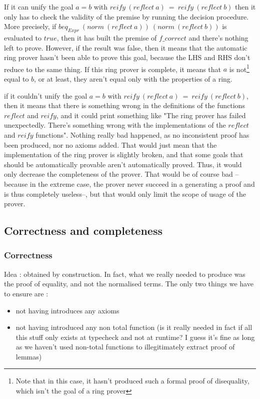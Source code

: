 \itemize
\item
If it can unify the goal $a=b$ with $reify\ (reflect\ a)\ =\ reify\ (reflect\ b)$ then it only has to check the validity of the premise by running the decision procedure. More precisely, if $beq_{Expr}\ (norm\ (reflect\ a))\ (norm\ (reflect\ b))$ is evaluated to $true$, then it has built the premise of $f\_correct$ and there's nothing left to prove. However, if the result was false, then it means that the automatic ring prover hasn't been able to prove this goal, because the LHS and RHS don't reduce to the same thing. If this ring prover is complete, it means that $a$ is not\footnote{Note that in this case, it hasn't produced such a formal proof of disequality, which isn't the goal of a ring prover} equal to $b$, or at least, they aren't equal only with the properties of a ring.
\item
if it couldn't unify the goal $a=b$ with $reify\ (reflect\ a)\ =\ reify\ (reflect\ b)$, then it means that there is something wrong in the definitions of the functions $reflect$ and $reify$, and it could print something like "The ring prover has failed unexpectedly. There's something wrong with the implementations of the $reflect$ and $reify$ functions". Nothing really bad happened, as no inconsistent proof has been produced, nor no axioms added. That would just mean that the implementation of the ring prover is slightly broken, and that some goals that should be automatically provable aren't automatically proved. Thus, it would only decrease the completeness of the prover. That would be of course bad --because in the extreme case, the prover never succeed in a generating a proof and is thus completely useless--, but that would only limit the scope of usage of the prover.

	\subsection {Correctness and completeness}

		\subsubsection{Correctness}
		
Idea : obtained by construction. In fact, what we really needed to produce was the proof of equality, and not the normalised terms. The only two things we have to ensure are :
\begin{itemize}
\item not having introduces any axioms
\item not having introduced any non total function (is it really needed in fact if all this stuff only exists at typecheck and not at runtime? I guess it's fine as long as we haven't used non-total functions to illegitimately extract proof of lemmas)
\end{itemize}

